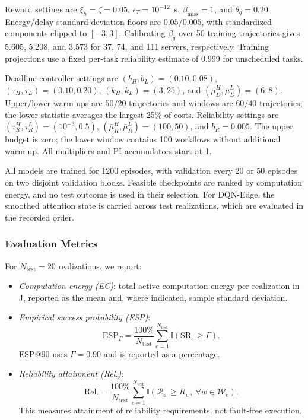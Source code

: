 \documentclass[journal]{IEEEtran}
\newcommand{\ind}{\mathbb{I}}
\begin{document}
Reward settings are
$\xi_h=\zeta=0.05$,
$\epsilon_T=10^{-12}$~s,
$\beta_{\mathrm{miss}}=1$, and $\theta_q=0.20$.
Energy/delay standard-deviation floors are $0.05/0.005$,
with standardized components clipped to $[-3,3]$.
Calibrating $\beta_q$ over 50 training trajectories gives
5.605, 5.208, and 3.573 for 37, 74, and 111 servers,
respectively. Training projections use a fixed per-task
reliability estimate of 0.999 for unscheduled tasks.

Deadline-controller settings are
$(b_H,b_L)=(0.10,0.08)$,
$(\tau_H,\tau_L)=(0.10,0.20)$,
$(k_H,k_L)=(3,25)$, and
$(\bar\mu_D^H,\bar\mu_D^L)=(6,8)$.
Upper/lower warm-ups are $50/20$ trajectories and windows
are $60/40$ trajectories; the lower statistic averages
the largest 25\% of costs.
Reliability settings are
$(\tau_R^H,\tau_R^L)=(10^{-3},0.5)$,
$(\bar\mu_R^H,\bar\mu_R^L)=(100,50)$, and $b_R=0.005$.
The upper budget is zero; the lower window contains
100 workflows without additional warm-up.
All multipliers and PI accumulators start at 1.

All models are trained for 1200 episodes, with validation every 20 or 50 episodes on two disjoint validation blocks. Feasible checkpoints are ranked by computation energy, and no test outcome is used in their selection. For DQN-Edge, the
smoothed attention state is carried across test realizations, which are evaluated in the recorded order.


\subsubsection{Evaluation Metrics}

For $N_{\mathrm{test}}=20$ realizations, we report:

\begin{itemize}
    \item \emph{Computation energy (EC)}: total active
    computation energy per realization in J, reported
    as the mean and, where indicated, sample standard deviation.

    \item \emph{Empirical success probability (ESP)}:
    \[
        \mathrm{ESP}_{\Gamma}
        =\frac{100\%}{N_{\mathrm{test}}}
        \sum_{e=1}^{N_{\mathrm{test}}}
        \ind(\mathrm{SR}_e\geq\Gamma).
    \]
    ESP@90 uses $\Gamma=0.90$ and is reported as a percentage.

    \item \emph{Reliability attainment (Rel.)}:
    \[
        \mathrm{Rel.}
        =\frac{100\%}{N_{\mathrm{test}}}
        \sum_{e=1}^{N_{\mathrm{test}}}
        \ind\!\left(
            \mathcal R_w\geq R_w,\ 
            \forall w\in\mathcal W_e
        \right).
    \]
    This measures attainment of reliability requirements,
    not fault-free execution.
\end{itemize}
\end{document}
